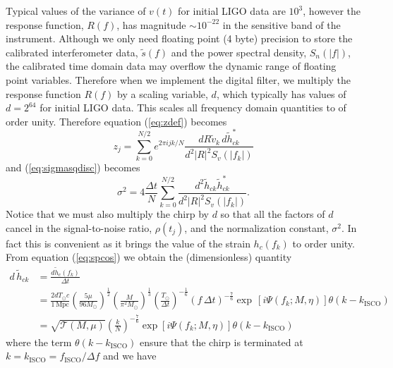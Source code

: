 Typical values of the variance of $v(t)$ for initial LIGO data are $10^3$,
however the response function, $R(f)$, has magnitude $\sim 10^{-22}$ in the
sensitive band of the instrument. Although we only need floating point (4
byte) precision to store the calibrated interferometer data, $\tilde{s}(f)$
and the power spectral density, $S_n(|f|)$, the calibrated time domain data may
overflow the dynamic range of floating point variables. Therefore when we
implement the digital filter, we multiply the response function $R(f)$ by a
scaling variable, $d$, which typically has values of $d = 2^{64}$ for initial
LIGO data. This scales all frequency domain quantities to of order  
unity.  Therefore equation (\ref{eq:zdef}) becomes
\begin{equation}
\label{eq:zdefcal}
z_j = \sum_{k=0}^{N/2} e^{2\pi ijk/N} 
  \frac{dR\tilde{v}_k\, d\tilde{h}_{ck}^\ast}
  {d^2|R|^2S_v\left(\left|f_k\right|\right)}
\end{equation}
and (\ref{eq:sigmasqdisc}) becomes
\begin{equation}
\label{eq:sigmasqdisccal}
\sigma^2 = 4 \frac{\Delta t}{N} \sum_{k=0}^{N/2}
\frac{d^2 \tilde{h}_{ck}\tilde{h}_{ck}^\ast}
{d^2|R|^2S_v\left(\left|f_k\right|\right)}. 
\end{equation}
Notice that we must also multiply the chirp by $d$ so that all the factors of
$d$ cancel in the signal-to-noise ratio, $\rho(t_j)$, and the normalization
constant, $\sigma^2$. In fact this is convenient as it brings the value of
the strain $h_c(f_k)$ to order unity. From equation (\ref{eq:spcos}) we obtain
the (dimensionless) quantity
\begin{equation}
\begin{split}
\label{eq:hck}
d\,\tilde{h}_{ck} &= \frac{d \tilde{h}_c(f_k)}{\Delta t} \\
&= 
\frac{2dT_\odot c}{1\,\mathrm{Mpc}}
\left(\frac{5\mu}{96M_\odot}\right)^\frac{1}{2}
\left(\frac{M}{\pi^2M_\odot}\right)^\frac{1}{3}
\left(\frac{T_\odot}{\Delta t}\right)^{-\frac{1}{6}}
\left( f\,\Delta t \right)^{-\frac{7}{6}}
\exp\,[i\Psi(f_k;M,\eta)] \theta\left(k-k_\mathrm{ISCO}\right)\\
&=
\sqrt{\mathcal{T}(M,\mu)}\left(\frac{k}{N}\right)^{-\frac{7}{6}}
\exp\left[i\Psi\left(f_k;M,\eta\right)\right] \theta\left(k-k_\mathrm{ISCO}\right)
\end{split}
\end{equation}
where the term $\theta\left(k-k_\mathrm{ISCO}\right)$ ensure that the chirp is
terminated at $k = k_\mathrm{ISCO} = f_\mathrm{ISCO} / \Delta f$ and we have 
